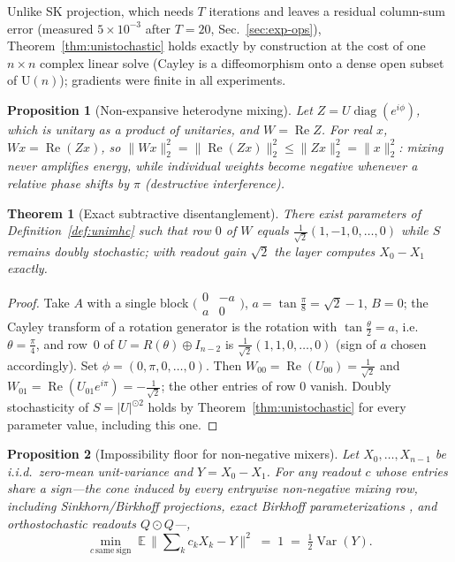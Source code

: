\documentclass{article}
\newtheorem{theorem}{Theorem}
\newtheorem{proposition}{Proposition}
\begin{document}
Unlike SK projection, which needs $T$ iterations and leaves a residual
column-sum error (measured $5\times10^{-3}$ after $T=20$,
Sec.~\ref{sec:exp-ops}), Theorem~\ref{thm:unistochastic} holds exactly by
construction at the cost of one $n\times n$ complex linear solve
(Cayley is a diffeomorphism onto a dense open subset of $\mathrm{U}(n)$);
gradients were finite in all experiments.

\begin{proposition}[Non-expansive heterodyne mixing]
\label{prop:safety}
Let $Z = U\operatorname{diag}(e^{i\phi})$, which is unitary as a product of
unitaries, and $W = \operatorname{Re} Z$. For real $x$,
$Wx = \operatorname{Re}(Zx)$, so
$\|Wx\|_2^2 = \|\operatorname{Re}(Zx)\|_2^2 \le \|Zx\|_2^2 = \|x\|_2^2$:
mixing never amplifies energy, while individual weights become negative
whenever a relative phase shifts by $\pi$ (destructive interference).
\end{proposition}

\begin{theorem}[Exact subtractive disentanglement]
\label{thm:subtraction}
There exist parameters of Definition~\ref{def:unimhc} such that row $0$ of $W$
equals $\tfrac{1}{\sqrt{2}}(1,-1,0,\dots,0)$ while $S$ remains doubly stochastic;
with readout gain $\sqrt{2}$ the layer computes $X_0 - X_1$ exactly.
\end{theorem}

\begin{proof}
Take $A$ with a single block $\big(\begin{smallmatrix}0&-a\\a&0\end{smallmatrix}\big)$,
$a=\tan\tfrac{\pi}{8}=\sqrt{2}-1$, $B=0$; the Cayley transform of a rotation
generator is the rotation with $\tan\tfrac{\theta}{2}=a$, i.e.\ $\theta=\tfrac{\pi}{4}$,
and row~0 of $U = R(\theta)\oplus I_{n-2}$ is
$\tfrac{1}{\sqrt2}(1,1,0,\dots,0)$ (sign of $a$ chosen accordingly). Set
$\phi = (0,\pi,0,\dots,0)$. Then
$W_{00} = \operatorname{Re}(U_{00}) = \tfrac{1}{\sqrt2}$ and
$W_{01} = \operatorname{Re}(U_{01}e^{i\pi}) = -\tfrac{1}{\sqrt2}$; the other
entries of row $0$ vanish. Doubly stochasticity of $S=|U|^{\odot2}$ holds by
Theorem~\ref{thm:unistochastic} for every parameter value, including this one.
\end{proof}

\begin{proposition}[Impossibility floor for non-negative mixers]
\label{prop:floor}
Let $X_0,\dots,X_{n-1}$ be i.i.d.\ zero-mean unit-variance and $Y = X_0 - X_1$.
For any readout $c$ whose entries share a sign---the cone induced by every
entrywise non-negative mixing row, including Sinkhorn/Birkhoff projections,
exact Birkhoff parameterizations \citep{gomhc2026}, and orthostochastic readouts
$Q\odot Q$---,
\begin{equation}
\min_{c\,\mathrm{same\ sign}} \;\mathbb{E}\,\big\| \textstyle\sum\nolimits_k c_k X_k - Y \big\|^{2}
\;=\; 1 \;=\; \tfrac{1}{2}\operatorname{Var}(Y).
\label{eq:floor}
\end{equation}
\end{proposition}
\end{document}
